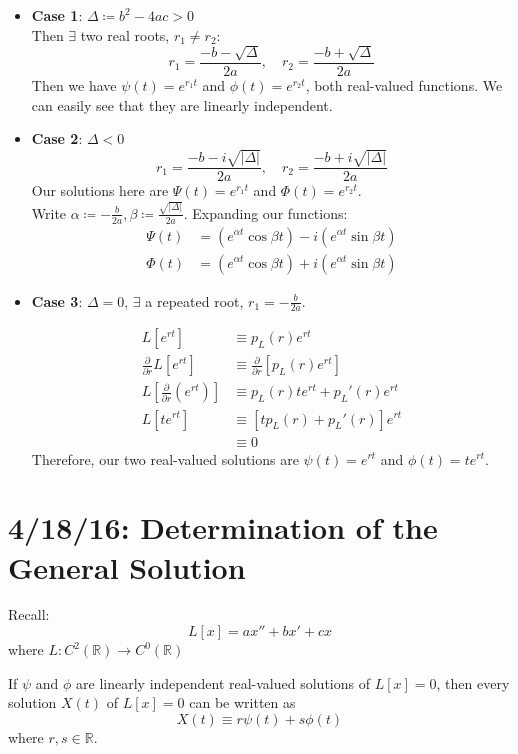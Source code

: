 \documentclass[12pt]{article}
\begin{document}
\begin{itemize}
\item \textbf{Case 1}: $\Delta \coloneqq b^2 - 4ac > 0$ \\
Then $\exists$ two real roots, $r_1 \neq r_2$:
\[ r_1 = \frac{-b-\sqrt{\Delta}}{2a}, \quad r_2 = \frac{-b+\sqrt{\Delta}}{2a} \]
Then we have $\psi(t) = e^{r_1t}$ and $\phi(t) = e^{r_2t}$, both real-valued functions. We can easily see that they are linearly independent.
\item \textbf{Case 2}: $\Delta < 0$ \\
\[ r_1 = \frac{-b-i\sqrt{|\Delta|}}{2a}, \quad r_2 = \frac{-b+i\sqrt{|\Delta|}}{2a} \]
Our solutions here are $\Psi(t) = e^{r_1t}$ and $\Phi(t) = e^{r_2t}$. \\

Write $\alpha \coloneqq -\frac{b}{2a}, \beta \coloneqq \frac{\sqrt{|\Delta|}}{2a}$. Expanding our functions:
\[
\begin{aligned}
  \Psi(t) &= (e^{\alpha t}\cos{\beta t}) - i(e^{\alpha t}\sin{\beta t}) \\
  \Phi(t) &= (e^{\alpha t}\cos{\beta t}) + i(e^{\alpha t}\sin{\beta t}) 
\end{aligned}
\]
\item \textbf{Case 3}: $\Delta = 0$, $\exists$ a repeated root, $r_1 = -\frac{b}{2a}$.

\[
\begin{aligned}
  L[e^{rt}] &\equiv p_L(r)e^{rt} \\
  \frac{\partial}{\partial r} L[e^{rt}] &\equiv \frac{\partial}{\partial r}[p_L(r)e^{rt}] \\
  L\left[\frac{\partial}{\partial r}(e^{rt})\right] &\equiv p_L(r)te^{rt} + p_L'(r)e^{rt} \\
  L[te^{rt}] &\equiv [tp_L(r) + p_L'(r)]e^{rt} \\
  &\equiv 0
\end{aligned}
\]
Therefore, our two real-valued solutions are $\psi(t) = e^{rt}$ and $\phi(t) = te^{rt}$.
\end{itemize}

\section{4/18/16: Determination of the General Solution}
Recall:\[ L[x] = ax'' + bx' + cx \]
where $L: C^2(\mathbb{R}) \to C^0(\mathbb{R})$

\begin{theorem}
If $\psi$ and $\phi$ are linearly independent real-valued solutions of $L[x] = 0$, then every solution $X(t)$ of $L[x] = 0$ can be written as \[ X(t) \equiv r\psi(t) + s\phi(t) \] where $r,s \in \mathbb{R}$.
\end{theorem}
\end{document}

